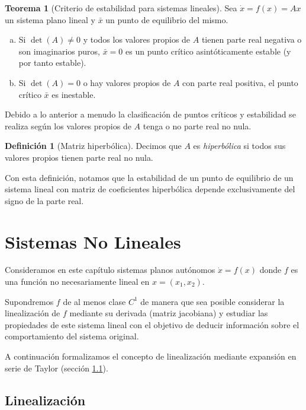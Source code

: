 \documentclass[11pt]{book}
\theoremstyle{definition}
\newtheorem{definition}{Definición}
\numberwithin{definition}{section}
\theoremstyle{theorem}
\newtheorem{theorem}{Teorema}
\numberwithin{theorem}{section}
\numberwithin{lemma}{section}
\numberwithin{corollary}{section}
\theoremstyle{plain}
\numberwithin{example}{section}
\begin{document}
\begin{theorem}[Criterio de estabilidad para sistemas lineales] \label{teo:criterioestabilidadlineales}
Sea $\dot{x} = f(x) = Ax$ un sistema plano lineal y $\bar{x}$ un punto de equilibrio del mismo.

\begin{enumerate}[(a)]
	\item Si $\det(A) \neq 0$ y todos los valores propios de $A$ tienen parte real negativa o son imaginarios puros, $\bar{x} = 0$ es un punto crítico asintóticamente estable (y por tanto estable).
	\item Si $\det(A) = 0$ o hay valores propios de $A$ con parte real positiva, el punto crítico $\bar{x}$ es inestable.
\end{enumerate}

Debido a lo anterior a menudo la clasificación de puntos críticos y estabilidad se realiza según los valores propios de $A$ tenga o no parte real no nula.

\begin{definition}[Matriz hiperbólica] Decimos que $A$ es \emph{hiperbólica} si todos sus valores propios tienen parte real no nula.
\end{definition}

Con esta definición, notamos que la estabilidad de un punto de equilibrio de un sistema lineal con matriz de coeficientes hiperbólica depende exclusivamente del signo de la parte real.

\end{theorem}

\chapter{Sistemas No Lineales}
Consideramos en este capítulo sistemas planos autónomos $\dot{x} = f(x)$ donde $f$ es una función no necesariamente lineal en $x = (x_1,x_2)$.

Supondremos $f$ de al menos clase $C^1$ de manera que sea posible considerar la linealización de $f$ mediante su derivada (matriz jacobiana) y estudiar las propiedades de este sistema lineal con el objetivo de deducir información sobre el comportamiento del sistema original.

A continuación formalizamos el concepto de linealización mediante expansión en serie de Taylor (sección \ref{sec:linealizacion}).

\section{Linealización} \label{sec:linealizacion}
\end{document}
